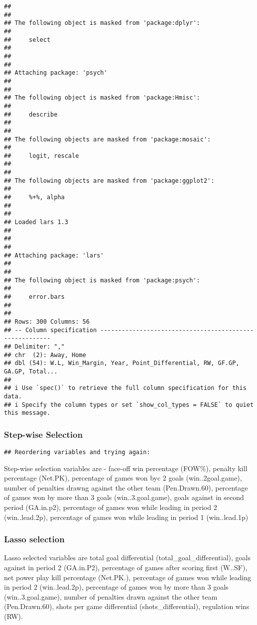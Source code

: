 \documentclass[
]{article}
\begin{document}
\begin{verbatim}
## 
## 
## The following object is masked from 'package:dplyr':
## 
##     select
## 
## 
## 
## Attaching package: 'psych'
## 
## 
## The following object is masked from 'package:Hmisc':
## 
##     describe
## 
## 
## The following objects are masked from 'package:mosaic':
## 
##     logit, rescale
## 
## 
## The following objects are masked from 'package:ggplot2':
## 
##     %+%, alpha
## 
## 
## Loaded lars 1.3
## 
## 
## 
## Attaching package: 'lars'
## 
## 
## The following object is masked from 'package:psych':
## 
##     error.bars
## 
## 
## Rows: 300 Columns: 56
## -- Column specification --------------------------------------------------------
## Delimiter: ","
## chr  (2): Away, Home
## dbl (54): W.L, Win_Margin, Year, Point_Differential, RW, GF.GP, GA.GP, Total...
## 
## i Use `spec()` to retrieve the full column specification for this data.
## i Specify the column types or set `show_col_types = FALSE` to quiet this message.
\end{verbatim}

\hypertarget{step-wise-selection}{%
\subsubsection{Step-wise Selection}\label{step-wise-selection}}

\begin{verbatim}
## Reordering variables and trying again:
\end{verbatim}

Step-wise selection variables are - face-off win percentage (FOW\%),
penalty kill percentage (Net.PK), percentage of games won byc 2 goals
(win..2goal.game), number of penalties drawng against the other team
(Pen.Drawn.60), percentage of games won by more than 3 goals
(win..3.goal.game), goals against in second period (GA.in.p2),
percentage of games won while leading in period 2 (win..lead.2p),
percentage of games won while leading in period 1 (win..lead.1p)

\hypertarget{lasso-selection}{%
\subsubsection{Lasso selection}\label{lasso-selection}}

Lasso selected variables are total goal differential
(total\_goal\_differential), goals against in period 2 (GA.in.P2),
percentage of games after scoring first (W..SF), net power play kill
percentage (Net.PK.), percentage of games won while leading in period 2
(win..lead.2p), percentage of games won by more than 3 goals
(win..3.goal.game), number of penalties drawn against the other team
(Pen.Drawn.60), shots per game differential (shots\_differential),
regulation wins (RW).
\end{document}
